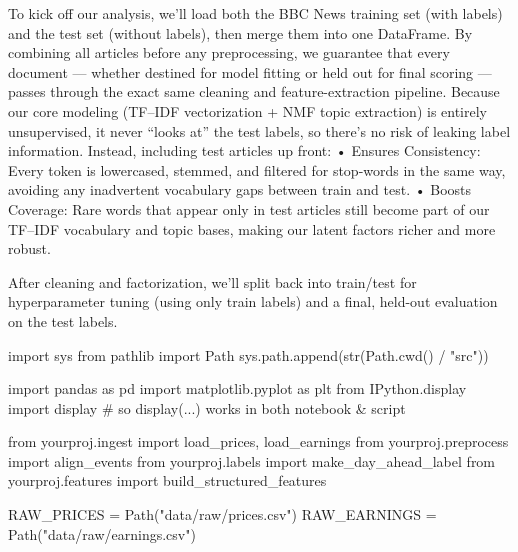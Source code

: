 \documentclass[
  letterpaper,
  DIV=11,
  numbers=noendperiod]{scrartcl}
\newenvironment{Shaded}{\begin{snugshade}}{\end{snugshade}}
\newcommand{\BuiltInTok}[1]{\textcolor[rgb]{0.00,0.23,0.31}{#1}}
\newcommand{\CommentTok}[1]{\textcolor[rgb]{0.37,0.37,0.37}{#1}}
\newcommand{\ImportTok}[1]{\textcolor[rgb]{0.00,0.46,0.62}{#1}}
\newcommand{\NormalTok}[1]{\textcolor[rgb]{0.00,0.23,0.31}{#1}}
\newcommand{\OperatorTok}[1]{\textcolor[rgb]{0.37,0.37,0.37}{#1}}
\newcommand{\StringTok}[1]{\textcolor[rgb]{0.13,0.47,0.30}{#1}}
\renewenvironment{Shaded}{%
  \begin{tcolorbox}[%
    colback=codebg,%
    colframe=codebg,%
    borderline west={3pt}{0pt}{sectionblue},%
    boxrule=0pt,%
    arc=0pt,%
    boxsep=5pt,%
    left=2mm,%
    right=2mm,%
    top=2mm,%
    bottom=2mm%
  ]%
}{%
  \end{tcolorbox}%
}
\begin{document}
To kick off our analysis, we'll load both the BBC News training set
(with labels) and the test set (without labels), then merge them into
one DataFrame. By combining all articles before any preprocessing, we
guarantee that every document --- whether destined for model fitting or
held out for final scoring --- passes through the exact same cleaning
and feature-extraction pipeline. Because our core modeling (TF--IDF
vectorization + NMF topic extraction) is entirely unsupervised, it never
``looks at'' the test labels, so there's no risk of leaking label
information. Instead, including test articles up front: • Ensures
Consistency: Every token is lowercased, stemmed, and filtered for
stop-words in the same way, avoiding any inadvertent vocabulary gaps
between train and test. • Boosts Coverage: Rare words that appear only
in test articles still become part of our TF--IDF vocabulary and topic
bases, making our latent factors richer and more robust.

After cleaning and factorization, we'll split back into train/test for
hyperparameter tuning (using only train labels) and a final, held-out
evaluation on the test labels.

\begin{Shaded}
\begin{Highlighting}[]
\ImportTok{import}\NormalTok{ sys}
\ImportTok{from}\NormalTok{ pathlib }\ImportTok{import}\NormalTok{ Path}
\NormalTok{sys.path.append(}\BuiltInTok{str}\NormalTok{(Path.cwd() }\OperatorTok{/} \StringTok{"src"}\NormalTok{))}

\ImportTok{import}\NormalTok{ pandas }\ImportTok{as}\NormalTok{ pd}
\ImportTok{import}\NormalTok{ matplotlib.pyplot }\ImportTok{as}\NormalTok{ plt}
\ImportTok{from}\NormalTok{ IPython.display }\ImportTok{import}\NormalTok{ display  }\CommentTok{\# so display(...) works in both notebook \& script}

\ImportTok{from}\NormalTok{ yourproj.ingest }\ImportTok{import}\NormalTok{ load\_prices, load\_earnings}
\ImportTok{from}\NormalTok{ yourproj.preprocess }\ImportTok{import}\NormalTok{ align\_events}
\ImportTok{from}\NormalTok{ yourproj.labels }\ImportTok{import}\NormalTok{ make\_day\_ahead\_label}
\ImportTok{from}\NormalTok{ yourproj.features }\ImportTok{import}\NormalTok{ build\_structured\_features}

\NormalTok{RAW\_PRICES }\OperatorTok{=}\NormalTok{ Path(}\StringTok{"data/raw/prices.csv"}\NormalTok{)}
\NormalTok{RAW\_EARNINGS }\OperatorTok{=}\NormalTok{ Path(}\StringTok{"data/raw/earnings.csv"}\NormalTok{)}
\end{Highlighting}
\end{Shaded}
\end{document}
